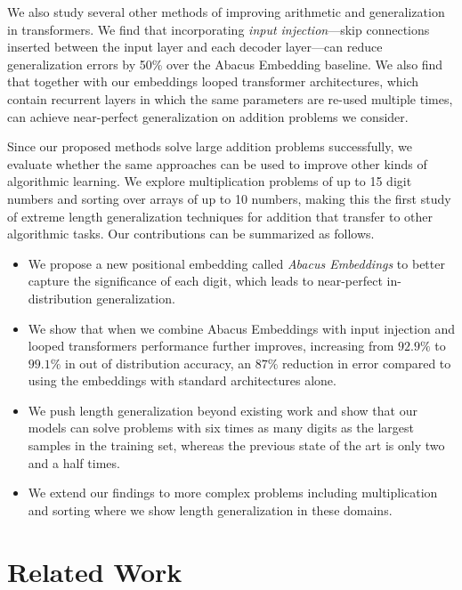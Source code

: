 \documentclass{article}
\begin{document}
We also study several other methods of improving arithmetic and generalization in transformers.  
We find that incorporating \textit{input injection}---skip connections inserted between the input layer and each decoder layer---can reduce generalization errors by 50\% over the Abacus Embedding baseline. 
We also find that together with our embeddings looped transformer architectures, which contain recurrent layers in which the same parameters are re-used multiple times, can achieve near-perfect generalization on addition problems we consider.

Since our proposed methods solve large addition problems successfully, we evaluate whether the same approaches can be used to improve other kinds of algorithmic learning. 
We explore multiplication problems of up to 15 digit numbers and sorting over arrays of up to 10 numbers, making this the first study of extreme length generalization techniques for addition that transfer to other algorithmic tasks.
Our contributions can be summarized as follows.
\begin{itemize}
    \item We propose a new positional embedding called \emph{Abacus Embeddings} to better capture the significance of each digit, which leads to near-perfect in-distribution generalization.
    \item We show that when we combine Abacus Embeddings with input injection and looped transformers performance further improves, increasing from \(92.9\%\) to \(99.1\%\) in out of distribution accuracy, an $87\%$ reduction in error compared to using the embeddings with standard architectures alone. 
    \item We push length generalization beyond existing work and show that our models can solve problems with six times as many digits as the largest samples in the training set, whereas the previous state of the art is only two and a half times.
    \item We extend our findings to more complex problems including multiplication and sorting where we show length generalization in these domains.
\end{itemize}

\section{Related Work}
\end{document}
